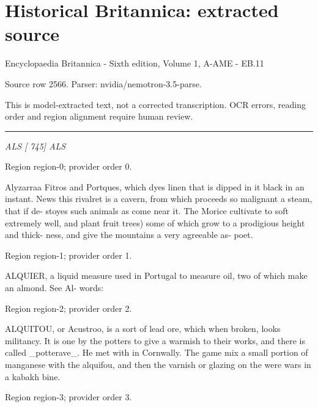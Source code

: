 \documentclass[11pt]{article}
\begin{document}
\section*{Historical Britannica: extracted source}
Encyclopaedia Britannica - Sixth edition, Volume 1, A-AME - EB.11\par
{\small Source row 2566. Parser: nvidia/nemotron-3.5-parse.\par}
{\small This is model-extracted text, not a corrected transcription. OCR errors, reading order and region alignment require human review.\par}
\hrule\medskip
{\small\itshape ALS [ 745] ALS\par}

{\scriptsize\color{gray} Region region-0; provider order 0.\par}
\medskip

Alyzarraa Fitros and Portques, which dyes linen that is dipped in it black in an instant. News this rivalret is a cavern, from which proceeds so malignant a steam, that if de- stoyes such animals as come near it. The Morice cultivate to soft extremely well, and plant fruit trees) some of which grow to a prodigious height and thick- ness, and give the mountains a very agreeable as- poet.
\par

{\scriptsize\color{gray} Region region-1; provider order 1.\par}
\medskip

ALQUIER, a liquid measure used in Portugal to measure oil, two of which make an almond. See Al- words:
\par

{\scriptsize\color{gray} Region region-2; provider order 2.\par}
\medskip

ALQUITOU, or Acustroo, is a sort of lead ore, which when broken, looks militancy. It is one by the potters to give a warmish to their works, and there is called \_potterave\_. He met with in Cornwally. The game mix a small portion of manganese with the alquifou, and then the varnish or glazing on the were wars in a kabakh bine.
\par

{\scriptsize\color{gray} Region region-3; provider order 3.\par}
\medskip
\end{document}
